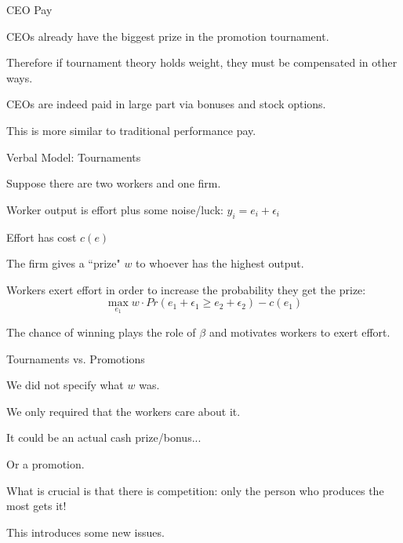 \documentclass[aspectratio=169,usenames,dvipsnames]{beamer}
\newenvironment{wideitemize}{\itemize\addtolength{\itemsep}{10pt}}{\enditemize}
\begin{document}
\begin{frame}{CEO Pay}

\begin{wideitemize}
    \item CEOs already have the biggest prize in the promotion tournament.
    \item Therefore if tournament theory holds weight, they must be compensated in other ways.
    \item CEOs are indeed paid in large part via bonuses and stock options.
    \item This is more similar to traditional performance pay.
\end{wideitemize}
    
\end{frame}


\begin{frame}{Verbal Model: Tournaments}
\begin{wideitemize}
    \item Suppose there are two workers and one firm.
    \item Worker output is effort plus some noise/luck: $y_i=e_i + \epsilon_i$
    \item Effort has cost $c(e)$
    \item The firm gives a ``prize" $w$ to whoever has the highest output.
    \item Workers exert effort in order to increase the probability they get the prize:
    \[\max_{e_1} w \cdot Pr(e_1 + \epsilon_1\geq e_2 + \epsilon_2) - c(e_1)\]
    \item The chance of winning plays the role of $\beta$ and motivates workers to exert effort.
\end{wideitemize}
    
\end{frame}

\begin{frame}{Tournaments vs. Promotions}

\begin{wideitemize}
\item We did not specify what $w$ was.
\item We only required that the workers care about it.
\item It could be an actual cash prize/bonus...
\pause
    \item Or a promotion.
    \item What is crucial is that there is competition: only the person who produces the most gets it!
    \item This introduces some new issues.
\end{wideitemize}
    
\end{frame}
\end{document}
